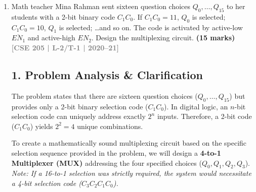 \documentclass[12pt,a3paper]{article}
\newcommand{\yr}[1]{\hfill\textcolor{gray}{\small\textbf{[#1]}}}
\newcommand{\mk}[1]{\textcolor{orange!70!black}{\small\textbf{(#1 marks)}}}
\begin{document}
\begin{enumerate}
\begin{tcolorbox}[enhanced,breakable,ansbox,colback=cD!4,colframe=cD,boxrule=0.8pt,arc=5pt,title={\textbf{Answer}},fonttitle=\bfseries\color{white},colbacktitle=cD]
The truth table visually confirms that the function generates a `0` exclusively at indices $1, 2, 4,$ and $5$, perfectly validating the analytical POS derivation.

\end{tcolorbox}

\item Math teacher Mina Rahman sent sixteen question choices $Q_0,\ldots,Q_{15}$ to her students with a 2-bit binary code $C_1C_0$. If $C_1C_0=11$, $Q_0$ is selected; $C_1C_0=10$, $Q_1$ is selected; \ldots and so on. The code is activated by active-low $\overline{EN_1}$ and active-high $EN_2$. Design the multiplexing circuit.
\mk{15} \yr{CSE 205 | L-2/T-1 | 2020--21}

\begin{tcolorbox}[enhanced,breakable,ansbox,colback=cD!4,colframe=cD,boxrule=0.8pt,arc=5pt,title={\textbf{Answer}},fonttitle=\bfseries\color{white},colbacktitle=cD]

\subsection*{1. Problem Analysis \& Clarification}
The problem states that there are sixteen question choices ($Q_0, \ldots, Q_{15}$) but provides only a 2-bit binary selection code ($C_1C_0$). In digital logic, an $n$-bit selection code can uniquely address exactly $2^n$ inputs. Therefore, a 2-bit code ($C_1C_0$) yields $2^2 = 4$ unique combinations. 

To create a mathematically sound multiplexing circuit based on the specific selection sequence provided in the problem, we will design a \textbf{4-to-1 Multiplexer (MUX)} addressing the four specified choices ($Q_0, Q_1, Q_2, Q_3$). 
\textit{Note: If a 16-to-1 selection was strictly required, the system would necessitate a 4-bit selection code ($C_3C_2C_1C_0$).}

\vspace{0.2cm}

\end{tcolorbox}
\end{enumerate}
\end{document}
